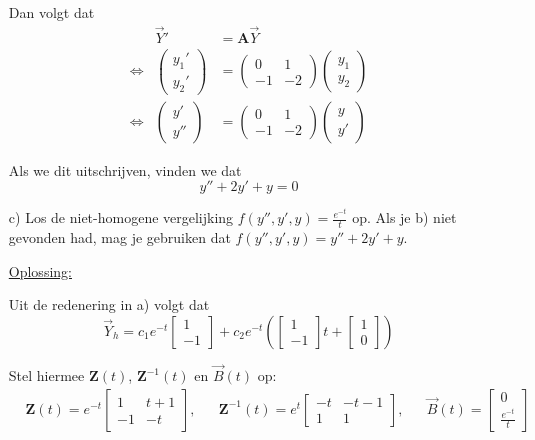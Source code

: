 \documentclass[kulak]{kulakarticle} %
\begin{document}
\begin{enumerate}
	Dan volgt dat
	\begin{align*}
		&&\vec{Y}' &= \textbf{A}\vec{Y} & \\
		& \Leftrightarrow & \left( \begin{matrix}
			y_1' \\
			y_2'
		\end{matrix} \right) &= \left(\begin{matrix}
		0 & 1 \\
		-1 & -2
		\end{matrix}\right)\left( \begin{matrix}
		y_1 \\
		y_2
		\end{matrix} \right) & \\
		& \Leftrightarrow & \left( \begin{matrix}
			y' \\
			y''
		\end{matrix} \right) &= \left(\begin{matrix}
		0 & 1 \\
		-1 & -2
		\end{matrix}\right)\left( \begin{matrix}
		y \\
		y'
		\end{matrix} \right) &
	\end{align*}

	Als we dit uitschrijven, vinden we dat \[y''+2y'+y=0\]

	\item[c)] Los de niet-homogene vergelijking \(f(y'',y',y)=\frac{e^{-t}}{t}\) op. Als je b) niet gevonden had, mag je gebruiken dat \(f(y'',y',y)=y''+2y'+y\).

	\underline{Oplossing:}

	Uit de redenering in a) volgt dat
	\[\vec{Y}_h = c_1 e^{-t} \left[\begin{matrix}
		1\\
		-1
	\end{matrix}\right] + c_2 e^{-t}\left( \left[\begin{matrix}
		1\\
		-1
	\end{matrix}\right]t + \left[ \begin{matrix}
		1 \\
		0
	\end{matrix} \right] \right)\]

	Stel hiermee \(\textbf{Z}(t)\), \(\textbf{Z}^{-1}(t)\) en \(\vec{B}(t)\) op:
	\begin{align*}
		& \textbf{Z}(t) = e^{-t} \begin{bmatrix}
			1 & t+1 \\
			-1 & -t
		\end{bmatrix}, & & \textbf{Z}^{-1}(t) = e^{t} \begin{bmatrix}
		-t & -t-1 \\
		1 & 1
		\end{bmatrix}, & & \vec{B}(t) = \begin{bmatrix}
		0 \\
		\frac{e^{-t}}{t}
		\end{bmatrix}
	\end{align*}


\end{enumerate}
\end{document}
